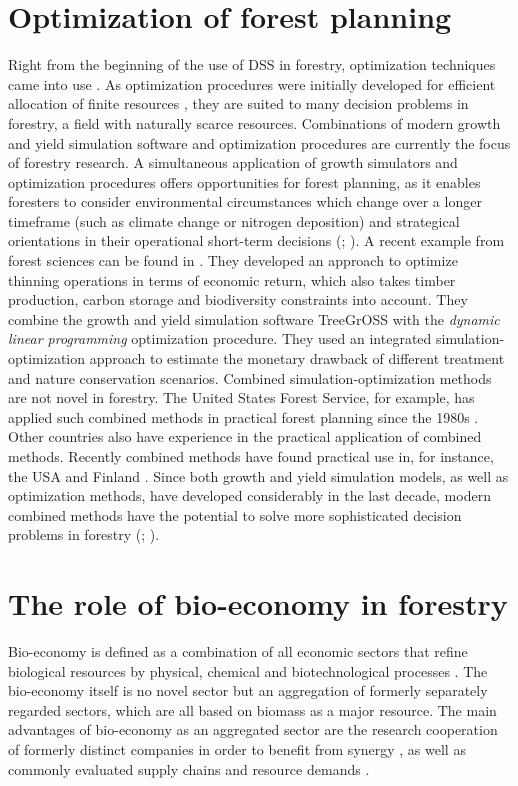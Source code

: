 \section{Optimization of forest planning}
\label{sec:intro:opt}
Right from the beginning of the use of DSS in forestry, optimization techniques came into use \citep[p. 16]{kangas_2015}. As optimization procedures were initially developed for efficient allocation of finite resources \citep[p. 271]{davis_2001}, they are suited to many decision problems in forestry, a field with naturally scarce resources. Combinations of modern growth and yield simulation software and optimization procedures are currently the focus of forestry research. A simultaneous application of growth simulators and optimization procedures offers opportunities for forest planning, as it enables foresters to consider environmental circumstances which change over a longer timeframe (such as climate change or nitrogen deposition) and strategical orientations in their operational short-term decisions (\citealp[p. 346-347]{mohring_2010}; \citealp[p. 1081]{pretzsch_2008}). A recent example from forest sciences can be found in \citet{yousefpour_2009}. They developed an approach to optimize thinning operations in terms of economic return, which also takes timber production, carbon storage and biodiversity constraints into account. They combine the growth and yield simulation software TreeGrOSS with the \textit{dynamic linear programming} optimization procedure. They used an integrated si\-mu\-la\-tion-op\-ti\-mi\-za\-tion approach to estimate the monetary drawback of different treatment and nature conservation scenarios. Combined si\-mu\-la\-tion-op\-ti\-mi\-za\-tion methods are not novel in forestry. The United States Forest Service, for example, has applied such combined methods in practical forest planning since the 1980s \citep[p. 33]{hoganson_2015}. Other countries also have experience in the practical application of combined methods. Recently combined methods have found practical use in, for instance, the USA and Finland \citep[p. 41]{hoganson_2015}. Since both growth and yield simulation models, as well as optimization methods, have developed considerably in the last decade, modern combined methods have the potential to solve more sophisticated decision problems in forestry (\citealp[p. 16-17]{kangas_2015}; \citealp[p. 93]{muys_2010}).

\section{The role of bio-economy in forestry}
\label{sec:intro:biecon}
Bio-economy is defined as a combination of all economic sectors that refine biological resources by physical, chemical and biotechnological processes \citep[p. 10462]{debesi_2015}. The bio-economy itself is no novel sector but an aggregation of formerly separately regarded sectors, which are all based on biomass as a major resource. The main advantages of bio-economy as an aggregated sector are the research cooperation of formerly distinct companies in order to benefit from synergy \citep[p. 1]{auer_2016}, as well as commonly evaluated supply chains and resource demands \citep[p. 3]{geldermann_2016}.

